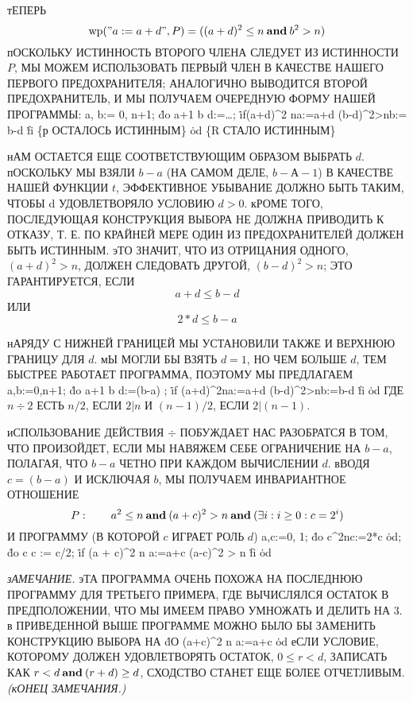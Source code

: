 тЕПЕРЬ
$$
\mathop{\rm wp}\nolimits("a:=a+d", P)=((a+d)^2\le n \mathbin{\bf and} b^2>n)
$$
пОСКОЛЬКУ ИСТИННОСТЬ ВТОРОГО ЧЛЕНА СЛЕДУЕТ ИЗ ИСТИННОСТИ $P$,
МЫ МОЖЕМ ИСПОЛЬЗОВАТЬ ПЕРВЫЙ ЧЛЕН В КАЧЕСТВЕ НАШЕГО
ПЕРВОГО ПРЕДОХРАНИТЕЛЯ; АНАЛОГИЧНО ВЫВОДИТСЯ ВТОРОЙ
ПРЕДОХРАНИТЕЛЬ, И МЫ ПОЛУЧАЕМ ОЧЕРЕДНУЮ ФОРМУ НАШЕЙ 
ПРОГРАММЫ:
\prg
a, b:= 0, n+1;
\.{do} a+1 \NE b \TO d:=\dots;
      \.{if}(a+d)^2 \LE n\TO a:=a+d
      \wbox (b-d)^2>n\TO b:= b-d
      \.{fi} \{р ОСТАЛОСЬ ИСТИННЫМ\}
\.{od} \{R СТАЛО ИСТИННЫМ\}
\grp

нАМ ОСТАЕТСЯ ЕЩЕ СООТВЕТСТВУЮЩИМ ОБРАЗОМ ВЫБРАТЬ $d$.
пОСКОЛЬКУ МЫ ВЗЯЛИ $b-a$ (НА САМОМ ДЕЛЕ, $b-А-1$) В КАЧЕСТВЕ
НАШЕЙ ФУНКЦИИ $t$, ЭФФЕКТИВНОЕ УБЫВАНИЕ ДОЛЖНО БЫТЬ ТАКИМ,
ЧТОБЫ d УДОВЛЕТВОРЯЛО УСЛОВИЮ $d>0$. кРОМЕ ТОГО, 
ПОСЛЕДУЮЩАЯ КОНСТРУКЦИЯ ВЫБОРА НЕ ДОЛЖНА ПРИВОДИТЬ К ОТКАЗУ, Т. Е.
ПО КРАЙНЕЙ МЕРЕ ОДИН ИЗ ПРЕДОХРАНИТЕЛЕЙ ДОЛЖЕН БЫТЬ
ИСТИННЫМ. эТО ЗНАЧИТ, ЧТО ИЗ ОТРИЦАНИЯ ОДНОГО, $(a+d)^2>n$, ДОЛЖЕН
СЛЕДОВАТЬ ДРУГОЙ, $(b-d)^2>n$; ЭТО ГАРАНТИРУЕТСЯ, ЕСЛИ
$$
a+d\le b-d
$$
ИЛИ
$$
2*d\le b-a
$$

нАРЯДУ С НИЖНЕЙ ГРАНИЦЕЙ МЫ УСТАНОВИЛИ ТАКЖЕ И ВЕРХНЮЮ
ГРАНИЦУ ДЛЯ $d$. мЫ МОГЛИ БЫ ВЗЯТЬ $d=1$, НО ЧЕМ БОЛЬШЕ $d$, ТЕМ
БЫСТРЕЕ РАБОТАЕТ ПРОГРАММА, ПОЭТОМУ МЫ ПРЕДЛАГАЕМ
\prg
a,b:=0,n+1;
\.{do} a+1 \NE b \TO d:=(b-a) ;
             \.{if} (a+d)^2\LE n\TO a:=a+d
                \wbox (b-d)^2>n\TO b:=b-d
             \.{fi}          
\.{od}
\grp
ГДЕ $n\div 2$ ЕСТЬ $n/2$, ЕСЛИ $2|n$ И $(n-1)/2$, ЕСЛИ $2|(n-1)$.

иСПОЛЬЗОВАНИЕ ДЕЙСТВИЯ $\div$ ПОБУЖДАЕТ  НАС РАЗОБРАТСЯ
В ТОМ, ЧТО ПРОИЗОЙДЕТ, ЕСЛИ МЫ НАВЯЖЕМ СЕБЕ ОГРАНИЧЕНИЕ НА $b-a$,
ПОЛАГАЯ, ЧТО $b-a$ ЧЕТНО ПРИ КАЖДОМ ВЫЧИСЛЕНИИ $d$. вВОДЯ 
$c=(b-a)$ И ИСКЛЮЧАЯ $b$, МЫ ПОЛУЧАЕМ ИНВАРИАНТНОЕ ОТНОШЕНИЕ
$$
P:\qquad a^2\le n \mathbin{\bf and} (a+c)^2 > n \mathbin{\bf and} (\exists i: i\ge 0 : c=2^i)
$$
И ПРОГРАММУ (В КОТОРОЙ $c$ ИГРАЕТ РОЛЬ $d$)
\prg
a,c:=0, 1; \.{do} c^2\LE n\TO c:=2*c \.{od};
\.{do} c  \TO c := c/2;
           \.{if} (a + c)^2 \LE n \TO a:=a+c
               \wbox (a-c)^2 > n \TO {}
           \.{fi}
\.{od}
\grp

{\sl зАМЕЧАНИЕ.} эТА ПРОГРАММА ОЧЕНЬ ПОХОЖА НА ПОСЛЕДНЮЮ
ПРОГРАММУ ДЛЯ ТРЕТЬЕГО ПРИМЕРА, ГДЕ ВЫЧИСЛЯЛСЯ ОСТАТОК В
ПРЕДПОЛОЖЕНИИ, ЧТО МЫ ИМЕЕМ ПРАВО УМНОЖАТЬ И ДЕЛИТЬ НА 3.
в ПРИВЕДЕННОЙ ВЫШЕ ПРОГРАММЕ МОЖНО БЫЛО БЫ ЗАМЕНИТЬ КОНСТРУКЦИЮ
ВЫБОРА НА
\prg
\.{dО} (a+c)^2 \LE n \TO a:=a+c \.{od}
\grp
еСЛИ УСЛОВИЕ, КОТОРОМУ ДОЛЖЕН УДОВЛЕТВОРЯТЬ ОСТАТОК,
$0\le r < d$, ЗАПИСАТЬ КАК $r<d \mathbin{\bf and} (r+d)\ge d$, СХОДСТВО СТАНЕТ
ЕЩЕ БОЛЕЕ ОТЧЕТЛИВЫМ. {\sl (кОНЕЦ ЗАМЕЧАНИЯ.)}

